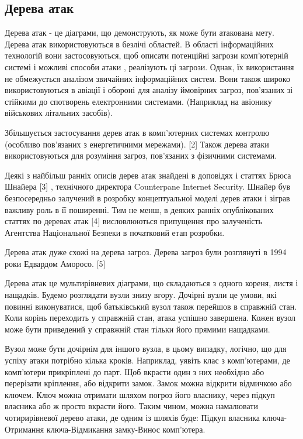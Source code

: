 \documentclass[oneside,final,14pt]{extreport}
\begin{document}
\subsection{Дерева атак}
\label{2section:id14}
Дерева атак - це діаграми, що демонструють, як може бути атакована мету. Дерева атак використовуються в безлічі областей. В області інформаційних технологій вони застосовуються, щоб описати потенційні загрози комп'ютерній системі і можливі способи атаки , реалізують ці загрози. Однак, їх використання не обмежується аналізом звичайних інформаційних систем. Вони також широко використовуються в авіації і обороні для аналізу ймовірних загроз, пов'язаних зі стійкими до спотворень електронними системами. (Наприклад на авіонику військових літальних засобів).

Збільшується застосування дерев атак в комп'ютерних системах контролю (особливо пов'язаних з енергетичними мережами). {[}2{]} Також дерева атаки використовуються для розуміння загроз, пов'язаних з фізичними системами.

Деякі з найбільш ранніх описів дерев атак знайдені в доповідях і статтях Брюса Шнайера {[}3{]} , технічного директора Counterpane Internet Security. Шнайер був безпосередньо залучений в розробку концептуальної моделі дерев атаки і зіграв важливу роль в її поширенні. Тим не менш, в деяких ранніх опублікованих статтях по деревах атак {[}4{]} висловлюються припущення про залученість Агентства Національної Безпеки в початковий етап розробки.

Дерева атак дуже схожі на дерева загроз. Дерева загроз були розглянуті в 1994 роки Едвардом Аморосо. {[}5{]}

Дерева атак це мультирівневих діаграми, що складаються з одного кореня, листя і нащадків. Будемо розглядати вузли знизу вгору. Дочірні вузли це умови, які повинні виконуватися, щоб батьківський вузол також перейшов в справжній стан. Коли корінь переходить у справжній стан, атака успішно завершена. Кожен вузол може бути приведений у справжній стан тільки його прямими нащадками.

Вузол може бути дочірнім для іншого вузла, в цьому випадку, логічно, що для успіху атаки потрібно кілька кроків. Наприклад, уявіть клас з комп'ютерами, де комп'ютери прикріплені до парт. Щоб вкрасти один з них необхідно або перерізати кріплення, або відкрити замок. Замок можна відкрити відмичкою або ключем. Ключ можна отримати шляхом погроз його власнику, через підкуп власника або ж просто вкрасти його. Таким чином, можна намалювати чотирирівневої дерево атаки, де одним із шляхів буде: Підкуп власника ключа-Отримання ключа-Відмикання замку-Винос комп'ютера.
\end{document}

